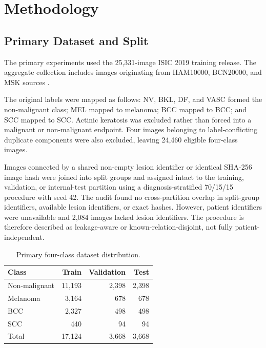 \section{Methodology}
\label{sec:methodology}

\subsection{Primary Dataset and Split}

The primary experiments used the 25,331-image ISIC 2019 training release. The
aggregate collection includes images originating from HAM10000, BCN20000, and
MSK sources
\cite{tschandl2018ham10000,combalia2019bcn20000,codella2017isic}.

The original labels were mapped as follows:
NV, BKL, DF, and VASC formed the non-malignant class; MEL mapped to melanoma;
BCC mapped to BCC; and SCC mapped to SCC. Actinic keratosis was excluded
rather than forced into a malignant or non-malignant endpoint. Four images
belonging to label-conflicting duplicate components were also excluded,
leaving 24,460 eligible four-class images.

Images connected by a shared non-empty lesion identifier or identical
SHA-256 image hash were joined into split groups and assigned intact to the
training, validation, or internal-test partition using a diagnosis-stratified
70/15/15 procedure with seed 42. The audit found no cross-partition overlap in
split-group identifiers, available lesion identifiers, or exact hashes.
However, patient identifiers were unavailable and 2,084 images lacked lesion
identifiers. The procedure is therefore described as leakage-aware or
known-relation-disjoint, not fully patient-independent.

\begin{table}[t]
    \centering
    \caption{Primary four-class dataset distribution.}
    \label{tab:data_distribution}
    \footnotesize
    \setlength{\tabcolsep}{4.1pt}
    \begin{tabular}{lrrr}
        \toprule
        Class & Train & Validation & Test \\
        \midrule
        Non-malignant & 11,193 & 2,398 & 2,398 \\
        Melanoma      &  3,164 &   678 &   678 \\
        BCC           &  2,327 &   498 &   498 \\
        SCC           &    440 &    94 &    94 \\
        \midrule
        Total         & 17,124 & 3,668 & 3,668 \\
        \bottomrule
    \end{tabular}
\end{table}

